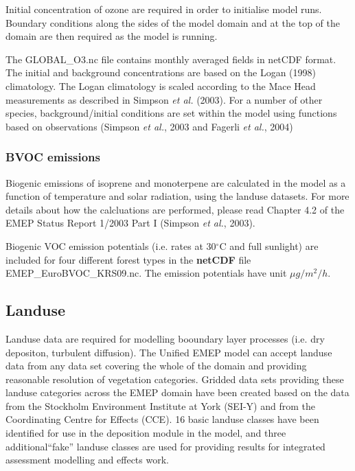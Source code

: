 Initial concentration of ozone are required in order to
initialise model runs. Boundary conditions along the sides of the model
domain and at the top of the domain are then required as the model is
running.

The GLOBAL\_O3.nc file contains monthly averaged fields in netCDF format. 
The initial and background
concentrations are based on the Logan (1998) climatology. The Logan
climatology is scaled according to the Mace Head measurements as
described in Simpson {\sl et al.} (2003). For a number of other species, 
background/initial conditions are set within the model using functions 
based on observations (Simpson {\sl et al.}, 2003 and Fagerli {\sl et al.}, 2004)



\subsubsection{BVOC emissions}

Biogenic emissions of isoprene and monoterpene are calculated in the model as a function of temperature 
and solar radiation, using the landuse datasets.  For more details about how the
calcluations are performed, please read Chapter 4.2 of the EMEP
Status Report 1/2003 Part I (Simpson {\sl et al.}, 2003).

Biogenic VOC emission potentials (i.e. rates at 30$^\circ$C and full sunlight)
are included for four different forest types in the {\bf netCDF } file \\
EMEP\_EuroBVOC\_KRS09.nc. 
The emission potentials have unit $\mu g/m^{2} /h$.


\subsection{Landuse}

Landuse data are required for modelling booundary layer processes
(i.e. dry depositon, turbulent diffusion).
The Unified EMEP model can accept landuse data from any
data set covering the whole of the domain and providing reasonable 
resolution of vegetation categories. Gridded data sets providing
these landuse categories across the EMEP domain have been created
based on the data from the Stockholm Environment Institute at York 
(SEI-Y) and from the Coordinating Centre for Effects (CCE). 
16 basic landuse classes have been identified for use in the
deposition module in the model, and three additional``fake'' landuse
classes are used for providing results for integrated assessment
modelling and effects work.

